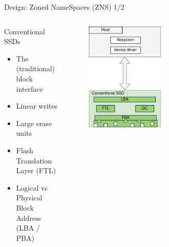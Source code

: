 \documentclass[aspectratio=169, notes]{beamer}
\begin{document}
\begin{frame}{Design: Zoned NameSpaces (ZNS) 1/2}
    \begin{columns}
        \begin{column}{0.45\textwidth}
            \footnotesize
            Conventional SSDs
            \begin{itemize}
                \item The (traditional) block interface
                \item Linear writes
                \item Large erase units
                \item Flash Translation Layer (FTL)
                \item Logical vs Physical Block Address \\ (LBA / PBA)
            \end{itemize}
        \end{column}
        \begin{column}{0.55\textwidth}
            \begingroup
            \small
            \begin{figure}
                \centering
                \includegraphics[width=0.5\textwidth]{resources/images/conventional.png}
            \end{figure}
            \endgroup
        \end{column}
    \end{columns}
\end{frame}
\end{document}
